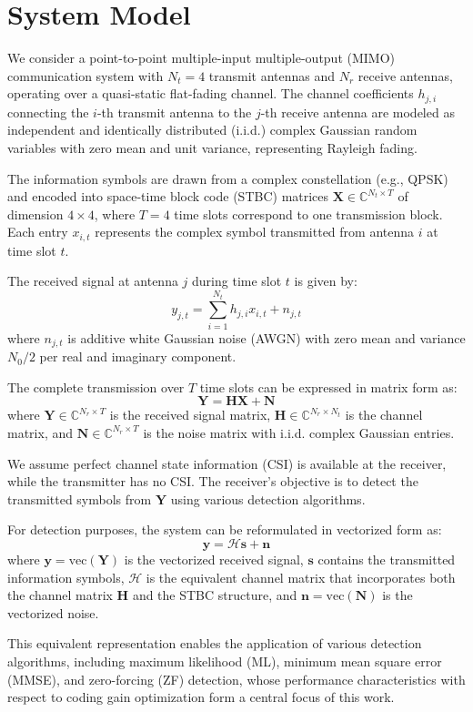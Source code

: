 \section{System Model}

We consider a point-to-point multiple-input multiple-output (MIMO) communication system with $N_t = 4$ transmit antennas and $N_r$ receive antennas, operating over a quasi-static flat-fading channel. 
The channel coefficients $h_{j,i}$ connecting the $i$-th transmit antenna to the $j$-th receive antenna are modeled as independent and identically distributed (i.i.d.) complex Gaussian random variables with zero mean and unit variance, representing Rayleigh fading.

The information symbols are drawn from a complex constellation (e.g., QPSK) and encoded into space-time block code (STBC) matrices $\mathbf{X} \in \mathbb{C}^{N_t \times T}$ of dimension $4 \times 4$, where $T = 4$ time slots correspond to one transmission block. 
Each entry $x_{i,t}$ represents the complex symbol transmitted from antenna $i$ at time slot $t$.

The received signal at antenna $j$ during time slot $t$ is given by:
\begin{equation}
y_{j,t} = \sum_{i=1}^{N_t} h_{j,i} x_{i,t} + n_{j,t}
\end{equation}
where $n_{j,t}$ is additive white Gaussian noise (AWGN) with zero mean and variance $N_0/2$ per real and imaginary component.

The complete transmission over $T$ time slots can be expressed in matrix form as:
\begin{equation} \label{eq:system_model_matrix}
\mathbf{Y} = \mathbf{H}\mathbf{X} + \mathbf{N}
\end{equation}
where $\mathbf{Y} \in \mathbb{C}^{N_r \times T}$ is the received signal matrix, $\mathbf{H} \in \mathbb{C}^{N_r \times N_t}$ is the channel matrix, and $\mathbf{N} \in \mathbb{C}^{N_r \times T}$ is the noise matrix with i.i.d. complex Gaussian entries.

We assume perfect channel state information (CSI) is available at the receiver, while the transmitter has no CSI. 
The receiver's objective is to detect the transmitted symbols from $\mathbf{Y}$ using various detection algorithms.

For detection purposes, the system can be reformulated in vectorized form as:
\begin{equation}
\mathbf{y} = \mathcal{H}\mathbf{s} + \mathbf{n}
\end{equation}
where $\mathbf{y} = \text{vec}(\mathbf{Y})$ is the vectorized received signal, $\mathbf{s}$ contains the transmitted information symbols, $\mathcal{H}$ is the equivalent channel matrix that incorporates both the channel matrix $\mathbf{H}$ and the STBC structure, and $\mathbf{n} = \text{vec}(\mathbf{N})$ is the vectorized noise.

This equivalent representation enables the application of various detection algorithms, including maximum likelihood (ML), minimum mean square error (MMSE), and zero-forcing (ZF) detection, whose performance characteristics with respect to coding gain optimization form a central focus of this work.
